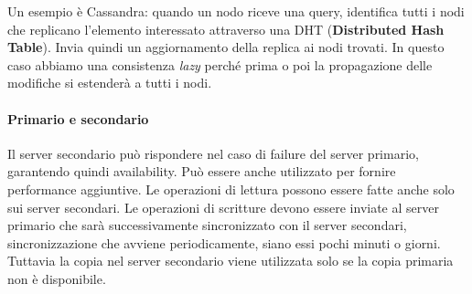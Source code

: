 \documentclass{article}
\begin{document}
		Un esempio è Cassandra: quando un nodo riceve una query, identifica tutti i nodi che replicano l'elemento interessato attraverso una DHT (\textbf{Distributed Hash Table}). Invia quindi un aggiornamento della replica ai nodi trovati. In questo caso abbiamo una consistenza \textit{lazy} perché prima o poi la propagazione delle modifiche si estenderà a tutti i nodi.
		
		\paragraph{Primario e secondario}
		Il server secondario può rispondere nel caso di failure del server primario, garantendo quindi availability. Può essere anche utilizzato per fornire performance aggiuntive. Le operazioni di lettura possono essere fatte anche solo sui server secondari. Le operazioni di scritture devono essere inviate al server primario che sarà successivamente sincronizzato con il server secondari, sincronizzazione che avviene periodicamente, siano essi pochi minuti o giorni. Tuttavia la copia nel server secondario viene utilizzata solo se la copia primaria non è disponibile.
		
\end{document}
